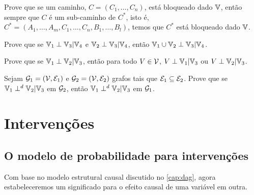 \begin{exercise}
 Prove que se um caminho,
 $C = (C_1, \ldots, C_n)$, está bloqueado
 dado ${\mathbb V}$, então sempre que $C$ é um sub-caminho de $C^*$,
 isto é, $C^* = (A_1, \ldots, A_m, C_1, \ldots, C_n, B_1, \ldots, B_l)$,
 temos que $C^*$ está bloqueado dado ${\mathbb V}$.
\end{exercise}

\begin{exercise}
 Prove que se ${\mathbb V}_1 \perp {\mathbb V}_3 | {\mathbb V}_4$ e
 ${\mathbb V}_2 \perp {\mathbb V}_3 | {\mathbb V}_4$, então
 ${\mathbb V}_1 \cup {\mathbb V}_2 \perp {\mathbb V}_3 | {\mathbb V}_4$.
\end{exercise}

\begin{exercise}
 Prove que se ${\mathbb V}_1 \perp {\mathbb V}_2 | {\mathbb V}_3$, então
 para todo $V \in {\mathcal V}$, 
 $V \perp {\mathbb V}_1 | {\mathbb V}_3$ ou
 $V \perp {\mathbb V}_2 | {\mathbb V}_3$.
\end{exercise}

\begin{exercise}
 \label{lemma:dsep_monotone}
 Sejam ${\mathcal G}_1 = ({\mathcal V}, {\mathcal E}_1)$ e
 ${\mathcal G}_2 = ({\mathcal V}, {\mathcal E}_2)$ grafos
 tais que ${\mathcal E}_1 \subseteq {\mathcal E}_2$.
 Prove que se ${\mathbb V}_1 \perp^d {\mathbb V}_2 | {\mathbb V}_3$ em ${\mathcal G}_2$, então
 ${\mathbb V}_1 \perp^d {\mathbb V}_2 | {\mathbb V}_3$ em ${\mathcal G}_1$.
\end{exercise}

\chapter{Intervenções}
\label{cap:intervencao}


\section{O modelo de probabilidade para intervenções}
\label{sec:intervencao}

Com base no modelo estrutural causal discutido 
no \cref{cap:dag}, agora estabeleceremos
um significado para o efeito causal
de uma variável em outra.

